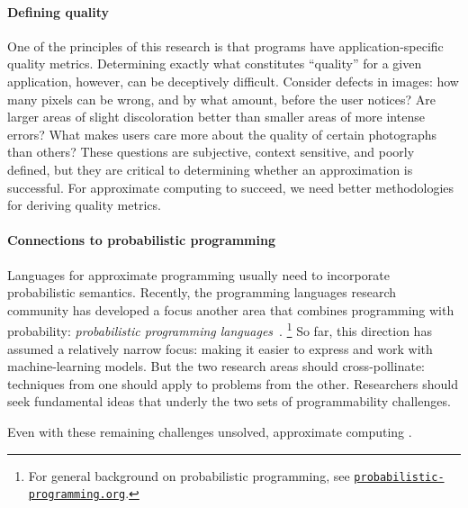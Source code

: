 \paragraph{Defining quality}
One of the principles of this research is that programs have
application-specific quality metrics.
Determining exactly what constitutes ``quality'' for a given application,
however, can be deceptively difficult.
Consider defects in images:
how many pixels can be wrong, and by what amount, before the user notices?
Are larger areas of slight discoloration better than smaller areas of more
intense errors?
What makes users care more about the quality of certain photographs than
others?
These questions are subjective, context sensitive, and poorly defined, but
they are critical to determining whether an approximation is successful.
For approximate computing to succeed, we need better methodologies for
deriving quality metrics.

\paragraph{Connections to probabilistic programming}
Languages for app\-roximate program\-ming usually need to incorporate probabilistic
semantics.
Recently, the programming languages research community has developed a focus
another area that combines programming with probability:
\emph{probabilistic programming languages}~\cite{BBGR13, wingate-lightweight,
  church, chaganty, pfeffersample, probdsl, koller}.%
\footnote{%
    For general background on probabilistic programming, see
    \href{http://probabilistic-programming.org/}{\texttt{probabilistic-programming.org}}.%
}
So far, this direction has assumed a relatively narrow focus:
making it easier to express and work with machine-learning models.
But the two research areas should cross-pollinate:
techniques from one should apply to problems from the other.
Researchers should seek fundamental ideas that underly the two sets of
programmability challenges.

\vspace{\baselineskip}
\noindent
Even with these remaining challenges unsolved, approximate computing .
